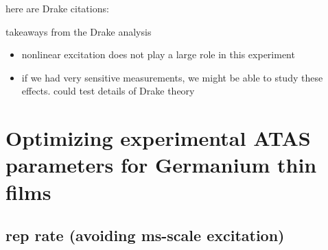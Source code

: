 here are Drake citations: \cite{austinSemiconductorSurfaceModification2017,wernerSingleShotMultiStageDamage2019,sergaevaUltrafastExcitationConductionband2018,austinFemtosecondLaserDamage2018}

takeaways from the Drake analysis
\begin{itemize}
	\item nonlinear excitation does not play a large role in this experiment
	\item if we had very sensitive measurements, we might be able to study these effects. could test details of Drake theory
\end{itemize}





\section{Optimizing experimental ATAS parameters for Germanium thin films}

\subsection{rep rate (avoiding ms-scale excitation)}

